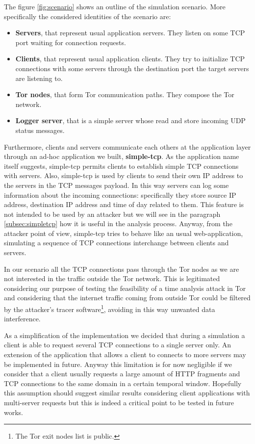The figure \ref{fig:scenario} shows an outline of the simulation
scenario. More specifically the considered identities of the scenario are:
\begin{itemize} 
	\item \textbf{Servers}, that represent usual application servers.
They listen on some TCP port waiting for connection requests.
	\item \textbf{Clients}, that represent usual application clients.
They try to initialize TCP connections with some servers through the
destination port the target servers are listening to.
	\item \textbf{Tor nodes}, that form Tor communication paths. They
compose the Tor network.
	\item \textbf{Logger server}, that is a simple server whose read
and store incoming UDP status messages.
\end{itemize}

Furthermore, clients and servers communicate each others at the application layer
through an ad-hoc application we built, \textbf{simple-tcp}. As the
application name itself suggests, simple-tcp permits clients to
establish simple TCP connections with servers. Also, simple-tcp is used
by clients to send their own IP address to the servers in the TCP
messages payload.
In this way servers can log some information about the incoming connections:
specifically they store source IP address,
destination IP address and time of day related to them. 
This feature is not intended to be used by an attacker but
we will see in the paragraph \ref{subsec:simpletcp} how
it is useful in the analysis process. Anyway, from the attacker point of
view, simple-tcp tries to behave like an usual web-application,
simulating a sequence of TCP connections interchange between clients and
servers. 

In our scenario all the TCP connections pass through the Tor
nodes as we are not interested in the traffic outside the Tor network. 
This is legitimated considering our purpose of testing the feasibility of a time analysis
attack in Tor and considering that the internet traffic coming from
outside Tor could be filtered by the attacker's tracer
software\footnote{The Tor exit nodes list is public\cite{torstatus}.}, avoiding in this
way unwanted data interference.

As a simplification of the implementation we decided that during a
simulation a client is able to
request several TCP connections to a single server only. 
An extension of the application that allows a client to connects to more servers may be
implemented in future. Anyway this limitation is for now negligible if we
consider that a client usually requests a large amount of HTTP fragments and TCP
connections to the same
domain in a certain temporal window. Hopefully this assumption should
suggest similar results considering client applications with multi-server
requests but this is indeed a critical point to be tested in future
works.

